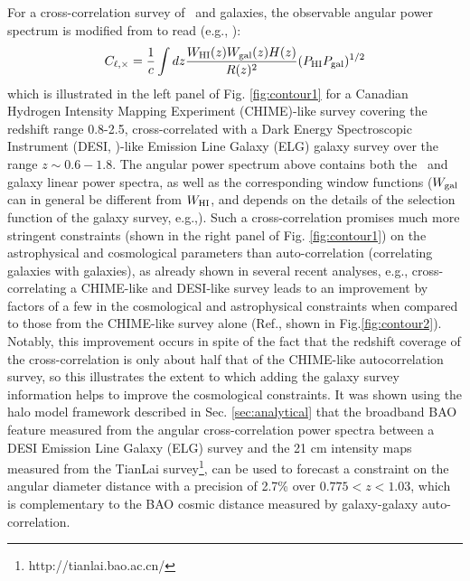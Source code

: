 For a cross-correlation survey of \HI\ and galaxies, the observable angular power spectrum is modified from  to read (e.g., \cite{hpcrosscorr2020}):
\begin{equation}
C_{\ell, \times} = \frac{1}{c} \int dz \frac{{W_{\rm HI}(z) W_{\rm gal}(z)} 
H(z)}{R(z)^2} 
(P_{\rm HI} P_{\rm gal})^{1/2}
\label{angcross}
\end{equation}
which is illustrated in the left panel of Fig. \ref{fig:contour1} for a Canadian Hydrogen Intensity Mapping Experiment (CHIME)-like survey covering the redshift range 0.8-2.5, cross-correlated with a Dark Energy Spectroscopic Instrument (DESI, \cite{desi2016})-like Emission Line Galaxy (ELG) galaxy survey over the range $z \sim 0.6-1.8$. The angular power spectrum above contains both the \HI\ and galaxy linear power spectra, as well as the corresponding window functions  ($W_{\rm gal}$ can in general be different from $W_{\rm HI}$, and depends on the details of the selection function of the galaxy survey, e.g.,\cite{smail1995}). Such a cross-correlation promises much more stringent constraints (shown in the right panel of Fig. \ref{fig:contour1}) on the astrophysical and cosmological parameters than auto-correlation (correlating galaxies with galaxies), as already shown in several recent analyses,  e.g., cross-correlating a CHIME-like and DESI-like survey leads to an improvement by  factors of a few in the cosmological and astrophysical constraints when compared to those from the CHIME-like survey alone (Ref.\cite{hpcrosscorr2020}, shown in Fig.\ref{fig:contour2}). Notably, this improvement occurs in spite of the fact that the redshift coverage of the cross-correlation is only about half that of the CHIME-like autocorrelation survey, so this illustrates the extent to which adding the galaxy survey information helps to improve the cosmological constraints. 
 It was shown \cite{shi2020} using the halo model framework  described in Sec. \ref{sec:analytical} that the broadband BAO feature measured from the angular cross-correlation power spectra between a DESI  Emission Line Galaxy (ELG) survey and the 21 cm intensity maps measured from the TianLai survey\footnote{http://tianlai.bao.ac.cn/}, can be used to forecast a constraint on the angular diameter distance with a precision of 2.7\% over $0.775 < z < 1.03$, which is complementary to the BAO cosmic distance measured by galaxy-galaxy auto-correlation.
 
